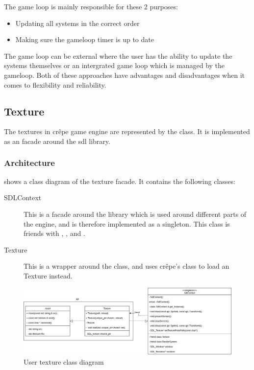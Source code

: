 \documentclass{projdoc}
\begin{document}
The game loop is mainly responsible for these 2 purposes:\noparbreak
\begin{itemize}
	\item Updating all systems in the correct order
	\item Making sure the gameloop timer is up to date
\end{itemize}

The game loop can be external where the user has the ability to update the systems
themselves or an intergrated game loop which is managed by the gameloop. Both of
these approaches have advantages and disadvantages when it comes to flexibility and
reliability.

\subsection{Texture}

The textures in cr\^epe game engine are represented by the  class. It
is implemented as an \gls{facade} around the \gls{sdl} library.

\subsubsection{Architecture}

 shows a class diagram of the texture \gls{facade}. It
contains the following classes:\noparbreak
\begin{description}
	\item[SDLContext] This is a facade around the  library which is
		used around different parts of the engine, and is therefore implemented as a
		singleton. This class is friends with ,
		,  and
		.
	\item[Texture] This is a wrapper around the  class, and
		uses cr\^epe's  class to load an Texture instead.
\end{description}

\begin{figure}
	\centering
	\includegraphics[width=\textwidth]{img/texture.png}
	\caption{User texture class diagram}
	\label{fig:class-texture}
\end{figure}
\end{document}
